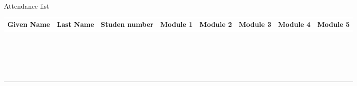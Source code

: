 \documentclass[a4paper]{article}
\title{\Title}
\author{\Author}
\newcommand{\Title}{Attendance list}
\begin{document}
\begin{center}
	\large
	\Title{}
\end{center}

\thispagestyle{empty}

\begin{tabular}{
	c|c|c 
	|c|c|c|c|c
	}
	Given Name \phantom{buff} & Last Name \phantom{buffer} & Studen number 
	& Module 1 \phantom{buf}
	& Module 2 \phantom{buf}
	& Module 3 \phantom{buf}
	& Module 4 \phantom{buf}
	& Module 5 \phantom{buf} \\
	\hline &&&&&&& \\[6pt]
	\hline &&&&&&& \\[6pt]
	\hline &&&&&&& \\[6pt]
	\hline &&&&&&& \\[6pt]
	\hline &&&&&&& \\[6pt]
	\hline &&&&&&& \\[6pt]
	\hline &&&&&&& \\[6pt]
	\hline &&&&&&& \\[6pt]
	\hline &&&&&&& \\[6pt]
	\hline &&&&&&& \\[6pt]
	\hline &&&&&&& \\[6pt]
	\hline &&&&&&& \\[6pt]
	\hline &&&&&&& \\[6pt]
	\hline &&&&&&& \\[6pt]
	\hline &&&&&&& \\[6pt]
	\hline &&&&&&& \\[6pt]
	\hline &&&&&&& \\[6pt]
	\hline &&&&&&& \\[6pt]
	\hline &&&&&&& \\[6pt]
	\hline &&&&&&& \\[6pt]
\end{tabular}
\end{document}
